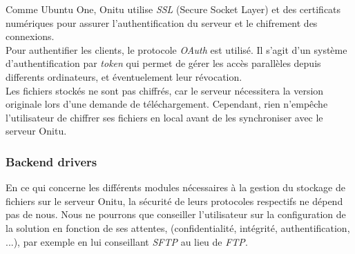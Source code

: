 Comme Ubuntu One, Onitu utilise \textit{SSL} (Secure Socket Layer) et des certificats numériques pour assurer l'authentification du serveur et le chifrement des connexions.\\

Pour authentifier les clients, le protocole \textit{OAuth} est utilisé. Il s'agit d'un système d'authentification par \textit{token} qui permet de gérer les accès parallèles depuis differents ordinateurs, et éventuelement leur révocation.\\

Les fichiers stockés ne sont pas chiffrés, car le serveur nécessitera la version originale lors d'une demande de téléchargement. Cependant, rien n'empêche l'utilisateur de chiffrer ses fichiers en local avant de les synchroniser avec le serveur Onitu.

\subsubsection{Backend drivers}
En ce qui concerne les différents modules nécessaires à la gestion du stockage de fichiers sur le serveur Onitu, la sécurité de leurs protocoles respectifs ne dépend pas de nous. Nous ne pourrons que conseiller l'utilisateur sur la configuration de la solution en fonction de ses attentes, (confidentialité, intégrité, authentification, ...), par exemple en lui conseillant \textit{SFTP} au lieu de \textit{FTP}.
